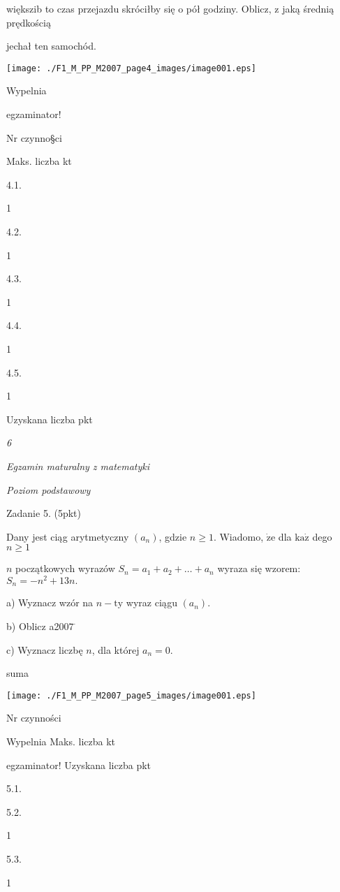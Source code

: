 \documentclass[a4paper,12pt]{article}
\begin{document}
większib to czas przejazdu skróciłby się o pół godziny. Oblicz, z jaką średnią prędkością

jechał ten samochód.
\begin{center}
\texttt{[image: ./F1\_M\_PP\_M2007\_page4\_images/image001.eps]}
\end{center}
Wypelnia

egzaminator!

Nr czynno\S ci

Maks. liczba kt

4.1.

1

4.2.

1

4.3.

1

4.4.

1

4.5.

1

Uzyskana liczba pkt





{\it 6}

{\it Egzamin maturalny z matematyki}

{\it Poziom podstawowy}

Zadanie 5. (5pkt)

Dany jest ciąg arytmetyczny $(a_{n})$, gdzie $n\geq 1$. Wiadomo, $\dot{\mathrm{z}}\mathrm{e}$ dla $\mathrm{k}\mathrm{a}\dot{\mathrm{z}}$ dego $n\geq 1$

$n$ początkowych wyrazów $S_{n}=a_{1}+a_{2}+\ldots+a_{n}$ wyraza się wzorem: $S_{n}=-n^{2}+13n.$

a) Wyznacz wzór na $n-\mathrm{t}\mathrm{y}$ wyraz ciągu $(a_{n}).$

b) Oblicz a200$7^{\cdot}$

c) Wyznacz liczbę $n$, dla której $a_{n}=0.$

suma
\begin{center}
\texttt{[image: ./F1\_M\_PP\_M2007\_page5\_images/image001.eps]}
\end{center}
Nr czynności

Wypelnia Maks. liczba kt

egzaminator! Uzyskana liczba pkt

5.1.

5.2.

1

5.3.

1
\end{document}
